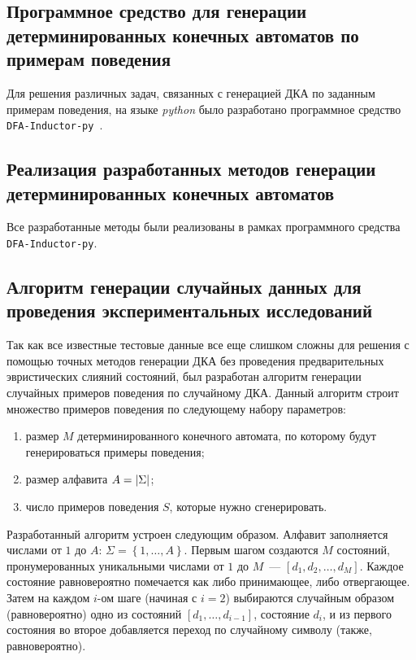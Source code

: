
\subsection{Программное средство для генерации детерминированных конечных автоматов по примерам поведения}
\label{sec:space:results:dfa-inductor-py}

Для решения различных задач, связанных с генерацией ДКА по заданным примерам поведения, на языке \emph{python} было разработано программное средство \texttt{DFA-Inductor-py}~\cite{dfa-inductor-py}.


\subsection{Реализация разработанных методов генерации детерминированных конечных автоматов}
\label{sec:space:results:impl}

Все разработанные методы были реализованы в рамках программного средства \texttt{DFA-Inductor-py}.



\subsection{Алгоритм генерации случайных данных для проведения экспериментальных исследований}
\label{sec:space:results:random-input}

Так как все известные тестовые данные все еще слишком сложны для решения с помощью точных методов генерации ДКА без проведения предварительных эвристических слияний состояний, был разработан алгоритм генерации случайных примеров поведения по случайному ДКА.
Данный алгоритм строит множество примеров поведения по следующему набору параметров:
\begin{enumerate}
  \item размер $M$ детерминированного конечного автомата, по которому будут генерироваться примеры поведения;
  \item размер алфавита $A=\lvert\Sigma\rvert$;
  \item число примеров поведения $S$, которые нужно сгенерировать.
\end{enumerate}
Разработанный алгоритм устроен следующим образом.
Алфавит заполняется числами от $1$ до $A$: $\Sigma=\left\{1,\ldots,A\right\}$.
Первым шагом создаются $M$ состояний, пронумерованных уникальными числами от $1$ до $M$~--- $\left[d_{1},d_{2},\ldots,d_{M}\right]$.
Каждое состояние равновероятно помечается как либо принимающее, либо отвергающее.
Затем на каждом $i$-ом шаге (начиная с $i = 2$) выбираются случайным образом (равновероятно) одно из состояний $\left[d_{1},\ldots,d_{i - 1}\right]$, состояние $d_{i}$, и из первого состояния во второе добавляется переход по случайному символу (также, равновероятно).

